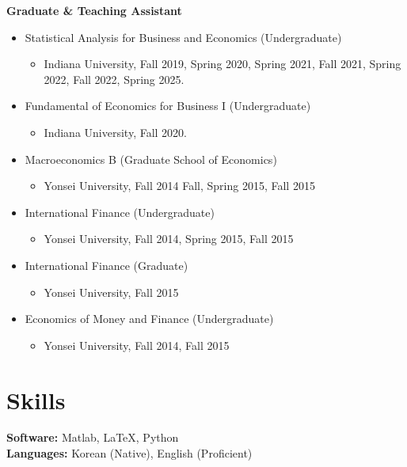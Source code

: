 \documentclass[11pt,a4paper]{article}
\begin{document}
\textbf{Graduate \& Teaching Assistant} 
\begin{itemize}[leftmargin=*]   
\item Statistical Analysis for Business and Economics (Undergraduate)
    \begin{itemize}[leftmargin=*]
        \item Indiana University, Fall 2019, Spring 2020, Spring 2021, Fall 2021, Spring 2022, Fall 2022, Spring 2025.
    \end{itemize}    
\item Fundamental of Economics for Business I (Undergraduate)
    \begin{itemize}[leftmargin=*]
        \item Indiana University, Fall 2020.
    \end{itemize}
\item Macroeconomics B (Graduate School of Economics)
    \begin{itemize}[leftmargin=*]
        \item Yonsei University, Fall 2014 Fall, Spring 2015, Fall 2015
    \end{itemize}
\item International Finance (Undergraduate)
    \begin{itemize}[leftmargin=*]
        \item Yonsei University, Fall 2014, Spring 2015, Fall 2015
    \end{itemize}
\item International Finance (Graduate)
    \begin{itemize}[leftmargin=*]
        \item Yonsei University, Fall 2015
    \end{itemize}    
\item Economics of Money and Finance (Undergraduate)
    \begin{itemize}[leftmargin=*]
        \item Yonsei University, Fall 2014, Fall 2015
    \end{itemize}

\end{itemize}
\vspace{5mm}

\vspace{5mm}
\section*{Skills}
\textbf{Software:} Matlab, LaTeX, Python \\
\textbf{Languages:} Korean (Native), English (Proficient)
\end{document}
